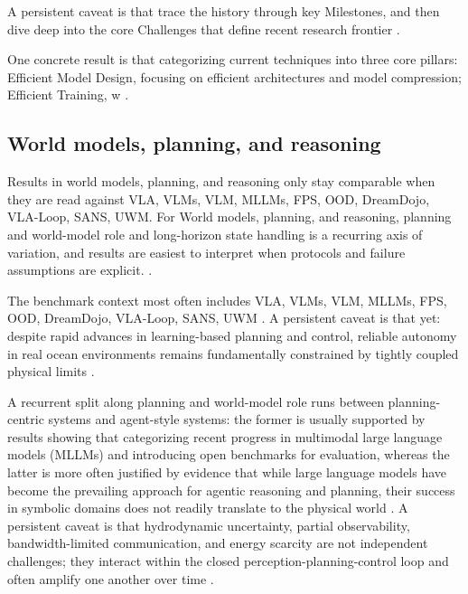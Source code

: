 \documentclass[a4paper,11pt]{article}
\begin{document}
A persistent caveat is that trace the history through key Milestones, and then dive deep into the core Challenges that define recent research frontier \citep{Xu2025Anatomy}.

One concrete result is that categorizing current techniques into three core pillars: Efficient Model Design, focusing on efficient architectures and model compression; Efficient Training, w \citep{Yu2025Survey}.

\subsection{World models, planning, and reasoning}


Results in world models, planning, and reasoning only stay comparable when they are read against VLA, VLMs, VLM, MLLMs, FPS, OOD, DreamDojo, VLA-Loop, SANS, UWM. For World models, planning, and reasoning, planning and world-model role and long-horizon state handling is a recurring axis of variation, and results are easiest to interpret when protocols and failure assumptions are explicit. \citep{Chen2026Accelerating,Cui2026Contact,Feng2025Survey,Fu2025Metis}.

The benchmark context most often includes VLA, VLMs, VLM, MLLMs, FPS, OOD, DreamDojo, VLA-Loop, SANS, UWM \citep{Xu2026Underwater,Bai2025Embodied,Tang2025Mind,Zheng2025Multimodal}. A persistent caveat is that yet: despite rapid advances in learning-based planning and control, reliable autonomy in real ocean environments remains fundamentally constrained by tightly coupled physical limits \citep{Xu2026Underwater}.

A recurrent split along planning and world-model role runs between planning-centric systems and agent-style systems: the former is usually supported by results showing that categorizing recent progress in multimodal large language models (MLLMs) and introducing open benchmarks for evaluation, whereas the latter is more often justified by evidence that while large language models have become the prevailing approach for agentic reasoning and planning, their success in symbolic domains does not readily translate to the physical world \citep{Tang2025Mind,Zheng2025Multimodal,Felicia2026From}. A persistent caveat is that hydrodynamic uncertainty, partial observability, bandwidth-limited communication, and energy scarcity are not independent challenges; they interact within the closed perception-planning-control loop and often amplify one another over time \citep{Xu2026Underwater}.
\end{document}

